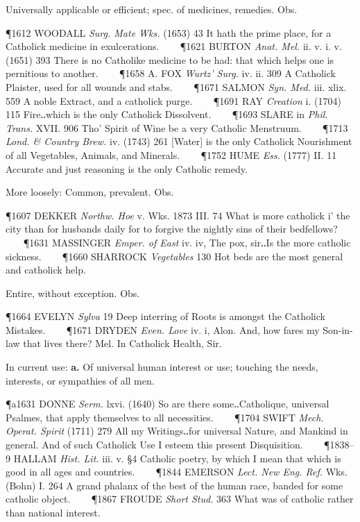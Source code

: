 \begin{description}[wide, labelwidth=!, labelindent=0pt]
\begin{myenumerate}
 Universally applicable or efficient; spec. of medicines, remedies. Obs.

\P 1612 WOODALL  \textit{Surg. Mate Wks.} (1653) 43 It hath the prime place, for a Catholick medicine in exulcerations.    
\P 1621 BURTON  \textit{Anat. Mel.} ii. v. i. v. (1651) 393 There is no Catholike medicine to be had: that which helps one is pernitious to another.    
\P 1658 A. FOX  \textit{Wurtz' Surg.} iv. ii. 309 A Catholick Plaister, used for all wounds and stabs.    
\P 1671 SALMON  \textit{Syn. Med.} iii. xlix. 559 A noble Extract, and a catholick purge.    
\P 1691 RAY  \textit{Creation} i. (1704) 115 Fire‥which is the only Catholick Dissolvent.    
\P 1693 SLARE in \textit{Phil. Trans.} XVII. 906 Tho' Spirit of Wine be a very Catholic Menstruum.    
\P 1713  \textit{Lond. \& Country Brew.} iv. (1743) 261 [Water] is the only Catholick Nourishment of all Vegetables, Animals, and Minerals.    
\P 1752 HUME  \textit{Ess.} (1777) II. 11 Accurate and just reasoning is the only Catholic remedy.

 More loosely: Common, prevalent. Obs.

\P 1607 DEKKER  \textit{Northw. Hoe} v. Wks. 1873 III.  74 What is more catholick i' the city than for husbands daily for to forgive the nightly sins of their bedfellows?    
\P 1631 MASSINGER  \textit{Emper. of East} iv. iv, The pox, sir‥Is the more catholic sickness.    
\P 1660 SHARROCK  \textit{Vegetables} 130 Hot beds are the most general and catholick help.

 Entire, without exception. Obs.

\P 1664 EVELYN  \textit{Sylva} 19 Deep interring of Roots is amongst the Catholick Mistakes.    
\P 1671 DRYDEN  \textit{Even. Love} iv. i, Alon. And, how fares my Son-in-law that lives there? Mel. In Catholick Health, Sir.

 In current use: \textbf{a.} Of universal human interest or use; touching the needs, interests, or sympathies of all men.

\P a1631 DONNE  \textit{Serm.} lxvi. (1640) So are there some‥Catholique, universal Psalmes, that apply themselves to all necessities.    
\P 1704 SWIFT  \textit{Mech. Operat. Spirit} (1711) 279 All my Writings‥for universal Nature, and Mankind in general. And of such Catholick Use I esteem this present Disquisition.    
\P 1838–9 HALLAM \textit{Hist. Lit.} iii. v. §4 Catholic poetry, by which I mean that which is good in all ages and countries.    
\P 1844 EMERSON  \textit{Lect. New Eng. Ref.} Wks. (Bohn) I. 264 A grand phalanx of the best of the human race, banded for some catholic object.    
\P 1867 FROUDE  \textit{Short Stud.} 363 What was of catholic rather than national interest.


\end{myenumerate}
\end{description}
